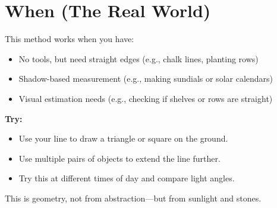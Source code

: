 \documentclass[11pt]{article}
\begin{document}
\section*{When (The Real World)}

This method works when you have:
\begin{itemize}
    \item No tools, but need straight edges (e.g., chalk lines, planting rows)
    \item Shadow-based measurement (e.g., making sundials or solar calendars)
    \item Visual estimation needs (e.g., checking if shelves or rows are straight)
\end{itemize}

\vspace{1em}
\textbf{Try:}
\begin{itemize}
    \item Use your line to draw a triangle or square on the ground.
    \item Use multiple pairs of objects to extend the line further.
    \item Try this at different times of day and compare light angles.
\end{itemize}

\vspace{1em}
This is geometry, not from abstraction—but from sunlight and stones.
\end{document}
